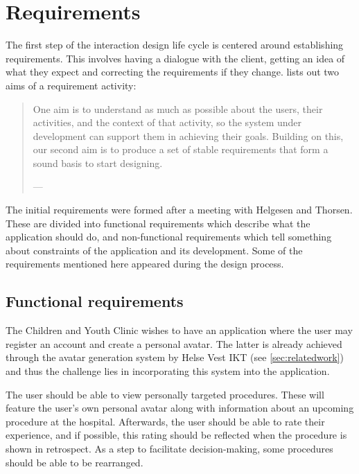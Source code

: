 \section{Requirements}
\label{sec:requirements}

The first step of the interaction design life cycle is centered around establishing requirements. This involves having a dialogue with the client, getting an idea of what they expect and correcting the requirements if they change. \textcite{preece2015} lists out two aims of a requirement activity:

\begin{quote}
    One aim is to understand as much as possible about the users, their activities, and the context of that activity, so the system under development can support them in achieving their goals. Building on this, our second aim is to produce a set of stable requirements that form a sound basis to start designing.

    \raggedleft--- \textcite{preece2015}
\end{quote}

The initial requirements were formed after a meeting with Helgesen and Thorsen. These are divided into functional requirements which describe what the application should do, and non-functional requirements which tell something about constraints of the application and its development. Some of the requirements mentioned here appeared during the design process.

\subsection{Functional requirements}

The Children and Youth Clinic wishes to have an application where the user may register an account and create a personal avatar. The latter is already achieved through the avatar generation system by Helse Vest IKT (see \autoref{sec:relatedwork}) and thus the challenge lies in incorporating this system into the application.

The user should be able to view personally targeted procedures. These will feature the user's own personal avatar along with information about an upcoming procedure at the hospital. Afterwards, the user should be able to rate their experience, and if possible, this rating should be reflected when the procedure is shown in retrospect. As a step to facilitate decision-making, some procedures should be able to be rearranged.

